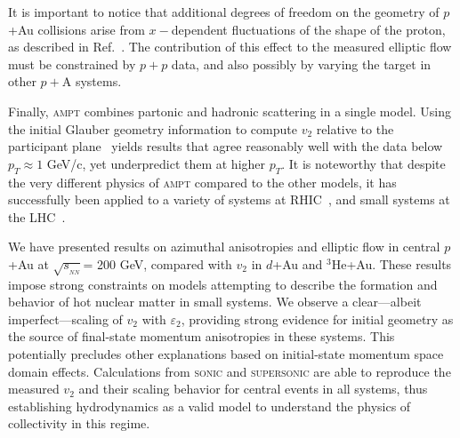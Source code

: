 \documentclass[%
reprint,
showpacs,preprintnumbers,
 amsmath,amssymb,
 aps,
]{revtex4-1}
\newcommand{\pt}{\mbox{$p_T$}\xspace}
\newcommand{\sqsn}{\mbox{$\sqrt{s_{_{NN}}}$}\xspace}
\newcommand{\dau}{\mbox{$d$+Au}\xspace}
\newcommand{\pau}{\mbox{$p$+Au}\xspace}
\newcommand{\hau}{\mbox{$^3\text{He}$+Au}\xspace}
\begin{document}
It is important to notice that additional degrees of freedom on the geometry of \pau collisions arise from $x-$dependent fluctuations of the shape of the proton, as described in Ref.~\cite{Schlichting:2014ipa}. The contribution of this effect to the measured elliptic flow must be constrained by $p+p$ data, and also possibly by varying the target in other $p+$A systems.

Finally, \textsc{ampt} combines partonic and hadronic scattering in a single model. Using the initial Glauber geometry information to compute $v_2$ relative to the participant plane~\cite{Koop:2015wea} yields results that agree reasonably well with the data below $\pt \approx 1$ GeV/c, yet underpredict them at higher \pt. It is noteworthy that despite the very different physics of \textsc{ampt} compared to the other models, it has successfully been applied to a variety of systems at RHIC~\cite{Adare:2015cpn,Koop:2015wea}, and small systems at the LHC~\cite{ma_long-range_2014,ma_long-range_2014}.

We have presented results on azimuthal anisotropies and elliptic flow in central \pau at \sqsn = 200 GeV, compared with $v_2$ in \dau and \hau. These results impose strong constraints on models attempting to describe the formation and behavior of hot nuclear matter in small systems. We observe a clear---albeit imperfect---scaling of $v_2$ with $\varepsilon_2$, providing strong evidence for initial geometry as the source of final-state momentum anisotropies in these systems. This potentially precludes other explanations based on initial-state momentum space domain effects. Calculations from \textsc{sonic} and \textsc{supersonic} are able to reproduce the measured $v_2$ and their scaling behavior for central events in all systems, thus establishing hydrodynamics as a valid model to understand the physics of collectivity in this regime. 


\end{document}
